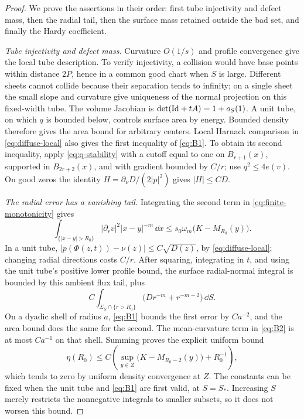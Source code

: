 \begin{proof}
We prove the assertions in their order: first tube injectivity and defect
mass, then the radial tail, then the surface mass retained outside the
bad set, and finally the Hardy coefficient.

\emph{Tube injectivity and defect mass.}
Curvature \(O(1/s)\) and profile convergence give the local tube
description.  To verify injectivity, a collision would have base
points within distance \(2P\), hence in a common good chart when
\(S\) is large.  Different sheets cannot collide because their separation
tends to infinity; on a single sheet the small slope and curvature
give uniqueness of the normal projection on this fixed-width tube.
The volume Jacobian is
\(\det(\mathrm{Id}+tA)=1+o_S(1)\).
A unit tube, on which \(q\) is bounded below, controls surface area by
energy.  Bounded density therefore gives the area bound for arbitrary
centers.  Local Harnack comparison in \eqref{eq:diffuse-local} also gives
the first inequality of \eqref{eq:B1}.  To obtain its second inequality,
apply \eqref{eq:q-stability} with a cutoff equal to one on \(B_{r+1}(x)\),
supported in \(B_{2r+2}(x)\), and with gradient bounded by \(C/r\);
use \(q^2\le4e(v)\).  On good zeros the identity
\(H=\partial_\nu D/(2|p|^2)\) gives \(|H|\le CD\).

\emph{The radial error has a vanishing tail.}
Integrating the second term in \eqref{eq:finite-monotonicity} gives
\[
 \int_{\{|x-y|>R_0\}}|\partial_rv|^2|x-y|^{-m}\,\dd x
 \le s_0\omega_m\bigl(K-M_{R_0}(y)\bigr).
\]
In a unit tube, \(|p(\Phi(z,t))-\nu(z)|\le C\sqrt{D(z)}\),
by \eqref{eq:diffuse-local}; changing radial directions costs \(C/r\).
After squaring, integrating in \(t\), and using the unit tube's positive
lower profile bound, the surface radial-normal integral is bounded
by this ambient flux tail, plus
\[
 C\int_{\Sigma_S\cap\{r>R_0\}}
       \bigl(Dr^{-m}+r^{-m-2}\bigr)\,\dd S.
\]
On a dyadic shell of radius \(a\), \eqref{eq:B1} bounds the first
error by \(Ca^{-2}\), and the area bound does the same for the second.
The mean-curvature term in \eqref{eq:B2} is at most \(Ca^{-1}\)
on that shell.  Summing proves the explicit uniform bound
\[
 \eta(R_0)\le C\left(
   \sup_{y\in Z}\bigl(K-M_{R_0-2}(y)\bigr)+R_0^{-1}\right),
\]
which tends to zero by uniform density convergence at \(Z\).
The constants can be fixed when the unit tube and
\eqref{eq:B1} are first valid, at \(S=S_*\).
Increasing \(S\) merely restricts the nonnegative integrals to
smaller subsets, so it does not worsen this bound.


\end{proof}
